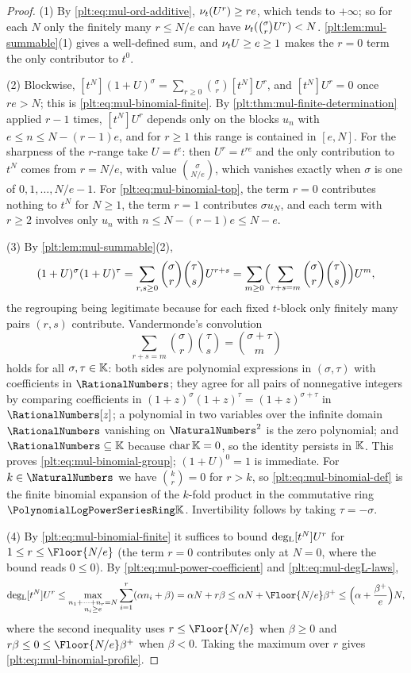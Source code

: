 \begin{proof}
(1) By \eqref{plt:eq:mul-ord-additive}, $\nu_{t}(U^r)\ge re$, which tends to
$+\infty$; so for each $N$ only the finitely many $r\le N/e$ can have
$\nu_{t}(\binom{\sigma}{r}U^r)<N$.  \cref{plt:lem:mul-summable}(1) gives a
well-defined sum, and $\nu_{t} U\ge e\ge1$ makes the $r=0$ term the only
contributor to $t^0$.

(2) Blockwise, $[t^N](1+U)^\sigma=\sum_{r\ge0}\binom{\sigma}{r}[t^N]U^r$, and
$[t^N]U^r=0$ once $re>N$; this is \eqref{plt:eq:mul-binomial-finite}.  By
\cref{plt:thm:mul-finite-determination} applied $r-1$ times, $[t^N]U^r$
depends only on the blocks $u_n$ with $e\le n\le N-(r-1)e$, and for $r\ge1$
this range is contained in $[e,N]$.  For the sharpness of the $r$-range take
$U=t^e$: then $U^r=t^{re}$ and the only contribution to $t^N$ comes from
$r=N/e$, with value $\binom{\sigma}{N/e}$, which vanishes exactly when
$\sigma$ is one of $0,1,\ldots,N/e-1$.  For
\eqref{plt:eq:mul-binomial-top}, the term $r=0$ contributes nothing to
$t^N$ for $N\ge1$, the term $r=1$ contributes $\sigma u_N$, and each term
with $r\ge2$ involves only $u_n$ with $n\le N-(r-1)e\le N-e$.

(3) By \cref{plt:lem:mul-summable}(2),
\[
 (1+U)^\sigma(1+U)^\tau
 =\sum_{r,s\ge0}\binom{\sigma}{r}\binom{\tau}{s}U^{r+s}
 =\sum_{m\ge0}\Bigl(\sum_{r+s=m}\binom{\sigma}{r}\binom{\tau}{s}\Bigr)U^m,
\]
the regrouping being legitimate because for each fixed $t$-block only
finitely many pairs $(r,s)$ contribute.  Vandermonde's convolution
\cite{graham-knuth-patashnik}
\[
 \sum_{r+s=m}\binom{\sigma}{r}\binom{\tau}{s}=\binom{\sigma+\tau}{m}
\]
holds for all $\sigma,\tau\in\mathbb{K}$: both sides are polynomial expressions in
$(\sigma,\tau)$ with coefficients in $\RationalNumbers$; they agree for all
pairs of nonnegative integers by comparing coefficients in
$(1+z)^{\sigma}(1+z)^{\tau}=(1+z)^{\sigma+\tau}$ in
$\RationalNumbers[z]$; a polynomial in two variables over the infinite domain
$\RationalNumbers$ vanishing on $\NaturalNumbers^2$ is the zero polynomial;
and $\RationalNumbers\subseteq\K$ because $\operatorname{char}\mathbb{K}=0$, so the
identity persists in $\mathbb{K}$.  This proves
\eqref{plt:eq:mul-binomial-group}; $(1+U)^0=1$ is immediate.  For
$k\in\NaturalNumbers$ we have $\binom{k}{r}=0$ for $r>k$, so
\eqref{plt:eq:mul-binomial-def} is the finite binomial expansion of the
$k$-fold product in the commutative ring $\PLpow$.  Invertibility follows by
taking $\tau=-\sigma$.

(4) By \eqref{plt:eq:mul-binomial-finite} it suffices to bound
$\operatorname{deg_{L}}[t^N]U^r$ for $1\le r\le\Floor{N/e}$ (the term $r=0$ contributes only
at $N=0$, where the bound reads $0\le0$).  By
\eqref{plt:eq:mul-power-coefficient} and \eqref{plt:eq:mul-degL-laws},
\[
 \degL[t^N]U^r
 \le\max_{\substack{n_1+\cdots+n_r=N\\ n_i\ge e}}
    \sum_{i=1}^{r}(\alpha n_i+\beta)
 =\alpha N+r\beta
 \le\alpha N+\Floor{N/e}\beta^+
 \le\Bigl(\alpha+\frac{\beta^+}{e}\Bigr)N,
\]
where the second inequality uses $r\le\Floor{N/e}$ when $\beta\ge0$ and
$r\beta\le0\le\Floor{N/e}\beta^+$ when $\beta<0$.  Taking the maximum over
$r$ gives \eqref{plt:eq:mul-binomial-profile}.
\end{proof}

